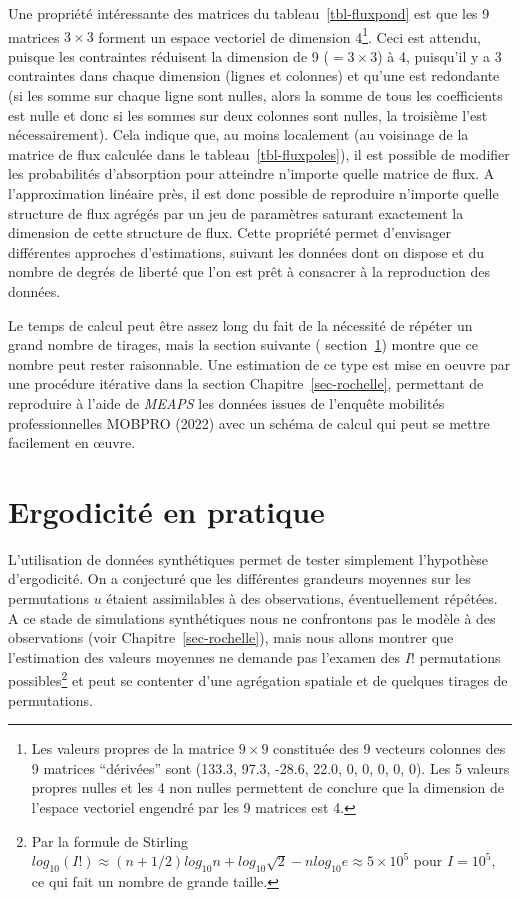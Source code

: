 \documentclass[
  10pt,
  a4paper,
  numbers=noendperiod,
  DIV=9]{scrartcl}
\begin{document}
Une propriété intéressante des matrices du tableau~\ref{tbl-fluxpond}
est que les 9 matrices \(3 \times 3\) forment un espace vectoriel de
dimension 4\footnote{Les valeurs propres de la matrice \(9 \times 9\)
  constituée des 9 vecteurs colonnes des 9 matrices ``dérivées'' sont
  (133.3, 97.3, -28.6, 22.0, 0, 0, 0, 0, 0). Les 5 valeurs propres
  nulles et les 4 non nulles permettent de conclure que la dimension de
  l'espace vectoriel engendré par les 9 matrices est 4.}. Ceci est
attendu, puisque les contraintes réduisent la dimension de 9
(\(=3\times 3\)) à 4, puisqu'il y a 3 contraintes dans chaque dimension
(lignes et colonnes) et qu'une est redondante (si les somme sur chaque
ligne sont nulles, alors la somme de tous les coefficients est nulle et
donc si les sommes sur deux colonnes sont nulles, la troisième l'est
nécessairement). Cela indique que, au moins localement (au voisinage de
la matrice de flux calculée dans le tableau~\ref{tbl-fluxpoles}), il est
possible de modifier les probabilités d'absorption pour atteindre
n'importe quelle matrice de flux. A l'approximation linéaire près, il
est donc possible de reproduire n'importe quelle structure de flux
agrégés par un jeu de paramètres saturant exactement la dimension de
cette structure de flux. Cette propriété permet d'envisager différentes
approches d'estimations, suivant les données dont on dispose et du
nombre de degrés de liberté que l'on est prêt à consacrer à la
reproduction des données.

Le temps de calcul peut être assez long du fait de la nécessité de
répéter un grand nombre de tirages, mais la section suivante (
section~\ref{sec-ergemp}) montre que ce nombre peut rester raisonnable.
Une estimation de ce type est mise en oeuvre par une procédure itérative
dans la section Chapitre~\ref{sec-rochelle}, permettant de reproduire à
l'aide de \emph{MEAPS} les données issues de l'enquête mobilités
professionnelles MOBPRO (2022) avec un schéma de calcul qui peut se
mettre facilement en œuvre.

\hypertarget{sec-ergemp}{%
\section{Ergodicité en pratique}\label{sec-ergemp}}

L'utilisation de données synthétiques permet de tester simplement
l'hypothèse d'ergodicité. On a conjecturé que les différentes grandeurs
moyennes sur les permutations \(u\) étaient assimilables à des
observations, éventuellement répétées. A ce stade de simulations
synthétiques nous ne confrontons pas le modèle à des observations (voir
Chapitre~\ref{sec-rochelle}), mais nous allons montrer que l'estimation
des valeurs moyennes ne demande pas l'examen des \(I!\) permutations
possibles\footnote{Par la formule de Stirling
  \(log_{10}(I!) \approx (n +1/2)log_{10} n +log_{10}\sqrt{2} - n log_{10}e \approx 5\times10^5\)
  pour \(I=10^5\), ce qui fait un nombre de grande taille.} et peut se
contenter d'une agrégation spatiale et de quelques tirages de
permutations.
\end{document}
